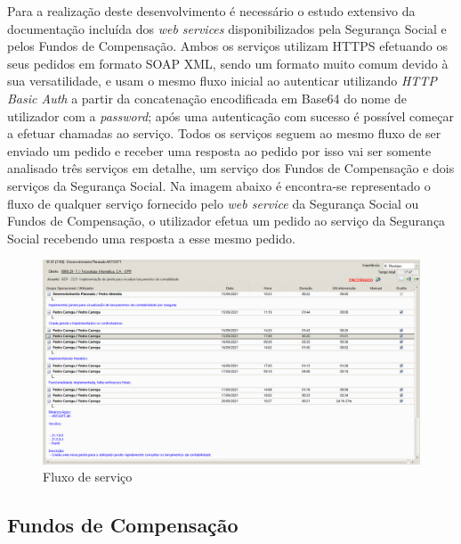 \documentclass[sigplan]{acmart}
\begin{document}
Para a realização deste desenvolvimento é necessário o estudo extensivo da documentação incluída dos \textit{web services} disponibilizados pela Segurança Social e pelos Fundos de Compensação. Ambos os serviços utilizam HTTPS efetuando os seus pedidos em formato SOAP XML, sendo um formato muito comum devido à sua versatilidade, e usam o mesmo fluxo inicial ao autenticar utilizando \textit{HTTP Basic Auth} a partir da concatenação encodificada em Base64 do nome de utilizador com a \textit{password}; após uma autenticação com sucesso é possível começar a efetuar chamadas ao serviço. Todos os serviços seguem ao mesmo fluxo de ser enviado um pedido e receber uma resposta ao pedido por isso vai ser somente analisado três serviços em detalhe, um serviço dos Fundos de Compensação e dois serviços da Segurança Social. Na imagem abaixo é encontra-se representado o fluxo de qualquer serviço fornecido pelo \textit{web service} da Segurança Social ou Fundos de Compensação, o utilizador efetua um pedido ao serviço da Segurança Social recebendo uma resposta a esse mesmo pedido.
\begin{figure}[htbp] %
	\centerline{\includegraphics[width=\linewidth]{figures/evento_formacao.png}}
	\caption{Fluxo de serviço}
	\label{fig3}
\end{figure}


\subsection{Fundos de Compensação}
\end{document}
